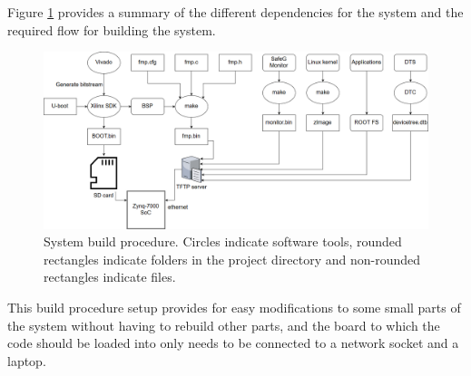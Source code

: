 Figure \ref{fig:system_build} provides a summary of the different dependencies for the system and the required flow for building the system.

\begin{figure}[H]
\centering
\includegraphics[width=\textwidth]{./img/literature_build1.png}
\caption{System build procedure. Circles indicate software tools, rounded rectangles indicate folders in the project directory and non-rounded rectangles indicate files.}\label{fig:system_build}
\end{figure}


This build procedure setup provides for easy modifications to some small parts of the system without having to rebuild other parts, and the board to which the code should be loaded into only needs to be connected to a network socket and a laptop.
